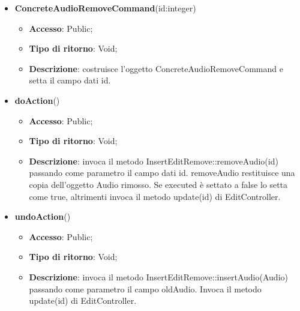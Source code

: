 {{{	
	\begin{itemize}
		\item \textbf{ConcreteAudioRemoveCommand}(id:integer)
		\begin{itemize}
			\item \textbf{Accesso}: Public;
			\item \textbf{Tipo di ritorno}: Void;
			\item \textbf{Descrizione}: costruisce l’oggetto ConcreteAudioRemoveCommand e setta il campo dati id.
		\end{itemize}
		\item \textbf{doAction}()
		\begin{itemize}
			\item \textbf{Accesso}: Public;
			\item \textbf{Tipo di ritorno}: Void;
			\item \textbf{Descrizione}: invoca il metodo InsertEditRemove::removeAudio(id) passando come parametro il campo dati id. removeAudio restituisce una copia dell’oggetto Audio rimosso. Se executed è settato a false lo setta come true, altrimenti invoca il metodo update(id) di EditController.
		\end{itemize}
		\item \textbf{undoAction}()
		\begin{itemize}
			\item \textbf{Accesso}: Public;
			\item \textbf{Tipo di ritorno}: Void;
			\item \textbf{Descrizione}: invoca il metodo InsertEditRemove::insertAudio(Audio) passando come parametro il campo oldAudio. Invoca il metodo update(id) di EditController.
		\end{itemize}
	\end{itemize}
	}
}}
